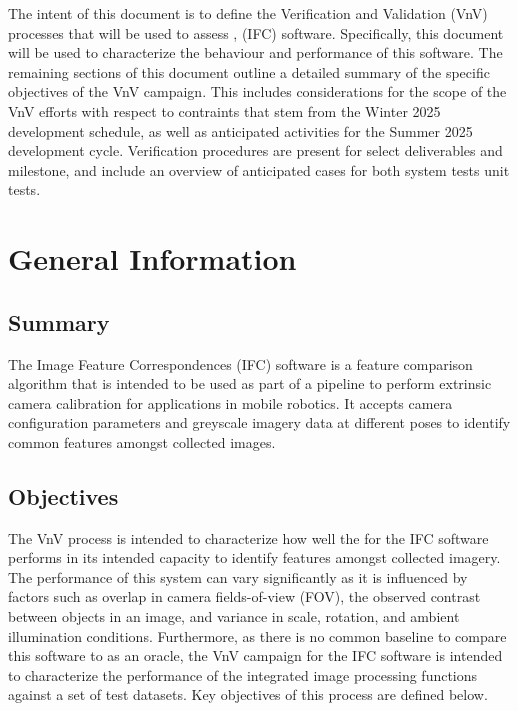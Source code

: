 \documentclass[12pt, titlepage]{article}
\begin{document}
\noindent The intent of this document is to define the Verification and Validation (VnV) processes
that will be used to assess \progname, (IFC) software. Specifically, this document will be used to 
characterize the behaviour and performance of this software. The remaining sections of this document 
outline a detailed summary of the specific objectives of the VnV campaign. This includes considerations 
for the scope of the VnV efforts with respect to contraints that stem from the Winter 2025
development schedule, as well as anticipated activities for the Summer 2025 development cycle.
Verification procedures are present for select deliverables and milestone, and include 
an overview of anticipated cases for both system tests unit tests.

\section{General Information}

\subsection{Summary}
The Image Feature Correspondences (IFC) software is a feature comparison algorithm that is intended 
to be used as part of a pipeline to perform extrinsic camera calibration for 
applications in mobile robotics. It accepts camera configuration parameters and greyscale imagery data at 
different poses to identify common features amongst collected images. 

\subsection{Objectives}
The VnV process is intended to characterize how well the for the IFC software performs in its 
intended capacity to identify features amongst collected imagery. The performance of this system 
can vary significantly as it is influenced by factors such as overlap in camera fields-of-view (FOV),
the observed contrast between objects in an image, and variance in scale, rotation, and ambient 
illumination conditions. Furthermore, as there is no common baseline to compare this software to as 
an oracle, the VnV campaign for the IFC software is intended to characterize the performance of the 
integrated image processing functions against a set of test datasets. Key objectives of this process 
are defined below.
\end{document}
